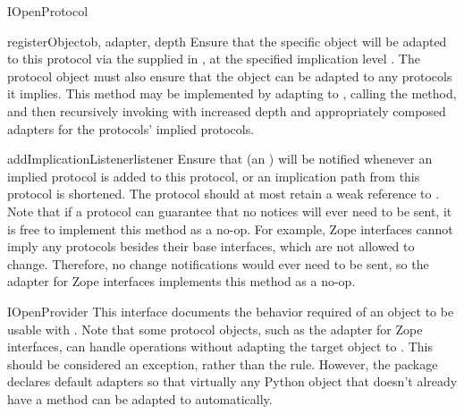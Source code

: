 \begin{verbatim%
}
\begin{verbatim%
}
\begin{verbatim%
}
\begin{verbatim%
}
\begin{classdesc*}{IOpenProtocol}
\begin{methoddesc}{registerObject}{ob, adapter, depth}
Ensure that the specific object  will be adapted to this protocol via
the  supplied in , at the specified
implication level .  The protocol object must also ensure that the
object can be adapted to any protocols it implies.  This method may be
implemented by adapting  to , calling the
 method, and then recursively invoking
 with increased depth and appropriately
composed adapters for the protocols' implied protocols.
\end{methoddesc}

\begin{methoddesc}{addImplicationListener}{listener}
Ensure that  (an ) will be notified
whenever an implied protocol is added to this protocol, or an implication path
from this protocol is shortened.  The protocol should at most retain a weak
reference to .  Note that if a protocol can guarantee that no
notices will ever need to be sent, it is free to implement this method as a
no-op.  For example, Zope interfaces cannot imply any protocols besides their
base interfaces, which are not allowed to change.  Therefore, no change
notifications would ever need to be sent, so the  adapter
for Zope interfaces implements this method as a no-op.
\end{methoddesc}



\end{classdesc*}












\begin{classdesc*}{IOpenProvider}
This interface documents the behavior required of an object to be usable with
.  Note that some protocol objects, such as the
 adapter for Zope interfaces, can handle
 operations without adapting the target object to
.  This should be considered an exception, rather than the
rule.  However, the  package declares default adapters so
that virtually any Python object that doesn't already have a
 method can be adapted to 
automatically.


\end{classdesc*}
\end{verbatim%
}
\end{verbatim%
}
\end{verbatim%
}
\end{verbatim%
}
